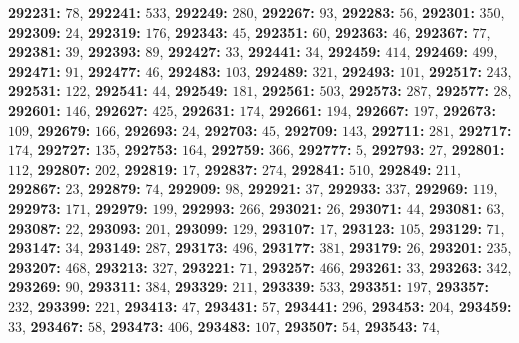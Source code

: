 \textsf{\bfseries 292231:} $78$, \textsf{\bfseries 292241:} $533$, \textsf{\bfseries 292249:} $280$, \textsf{\bfseries 292267:} $93$, \textsf{\bfseries 292283:} $56$, \textsf{\bfseries 292301:} $350$, \textsf{\bfseries 292309:} $24$, \textsf{\bfseries 292319:} $176$, \textsf{\bfseries 292343:} $45$, \textsf{\bfseries 292351:} $60$, \textsf{\bfseries 292363:} $46$, \textsf{\bfseries 292367:} $77$, \textsf{\bfseries 292381:} $39$, \textsf{\bfseries 292393:} $89$, \textsf{\bfseries 292427:} $33$, \textsf{\bfseries 292441:} $34$, \textsf{\bfseries 292459:} $414$, \textsf{\bfseries 292469:} $499$, \textsf{\bfseries 292471:} $91$, \textsf{\bfseries 292477:} $46$, \textsf{\bfseries 292483:} $103$, \textsf{\bfseries 292489:} $321$, \textsf{\bfseries 292493:} $101$, \textsf{\bfseries 292517:} $243$, \textsf{\bfseries 292531:} $122$, \textsf{\bfseries 292541:} $44$, \textsf{\bfseries 292549:} $181$, \textsf{\bfseries 292561:} $503$, \textsf{\bfseries 292573:} $287$, \textsf{\bfseries 292577:} $28$, \textsf{\bfseries 292601:} $146$, \textsf{\bfseries 292627:} $425$, \textsf{\bfseries 292631:} $174$, \textsf{\bfseries 292661:} $194$, \textsf{\bfseries 292667:} $197$, \textsf{\bfseries 292673:} $109$, \textsf{\bfseries 292679:} $166$, \textsf{\bfseries 292693:} $24$, \textsf{\bfseries 292703:} $45$, \textsf{\bfseries 292709:} $143$, \textsf{\bfseries 292711:} $281$, \textsf{\bfseries 292717:} $174$, \textsf{\bfseries 292727:} $135$, \textsf{\bfseries 292753:} $164$, \textsf{\bfseries 292759:} $366$, \textsf{\bfseries 292777:} $5$, \textsf{\bfseries 292793:} $27$, \textsf{\bfseries 292801:} $112$, \textsf{\bfseries 292807:} $202$, \textsf{\bfseries 292819:} $17$, \textsf{\bfseries 292837:} $274$, \textsf{\bfseries 292841:} $510$, \textsf{\bfseries 292849:} $211$, \textsf{\bfseries 292867:} $23$, \textsf{\bfseries 292879:} $74$, \textsf{\bfseries 292909:} $98$, \textsf{\bfseries 292921:} $37$, \textsf{\bfseries 292933:} $337$, \textsf{\bfseries 292969:} $119$, \textsf{\bfseries 292973:} $171$, \textsf{\bfseries 292979:} $199$, \textsf{\bfseries 292993:} $266$, \textsf{\bfseries 293021:} $26$, \textsf{\bfseries 293071:} $44$, \textsf{\bfseries 293081:} $63$, \textsf{\bfseries 293087:} $22$, \textsf{\bfseries 293093:} $201$, \textsf{\bfseries 293099:} $129$, \textsf{\bfseries 293107:} $17$, \textsf{\bfseries 293123:} $105$, \textsf{\bfseries 293129:} $71$, \textsf{\bfseries 293147:} $34$, \textsf{\bfseries 293149:} $287$, \textsf{\bfseries 293173:} $496$, \textsf{\bfseries 293177:} $381$, \textsf{\bfseries 293179:} $26$, \textsf{\bfseries 293201:} $235$, \textsf{\bfseries 293207:} $468$, \textsf{\bfseries 293213:} $327$, \textsf{\bfseries 293221:} $71$, \textsf{\bfseries 293257:} $466$, \textsf{\bfseries 293261:} $33$, \textsf{\bfseries 293263:} $342$, \textsf{\bfseries 293269:} $90$, \textsf{\bfseries 293311:} $384$, \textsf{\bfseries 293329:} $211$, \textsf{\bfseries 293339:} $533$, \textsf{\bfseries 293351:} $197$, \textsf{\bfseries 293357:} $232$, \textsf{\bfseries 293399:} $221$, \textsf{\bfseries 293413:} $47$, \textsf{\bfseries 293431:} $57$, \textsf{\bfseries 293441:} $296$, \textsf{\bfseries 293453:} $204$, \textsf{\bfseries 293459:} $33$, \textsf{\bfseries 293467:} $58$, \textsf{\bfseries 293473:} $406$, \textsf{\bfseries 293483:} $107$, \textsf{\bfseries 293507:} $54$, \textsf{\bfseries 293543:} $74$, 
